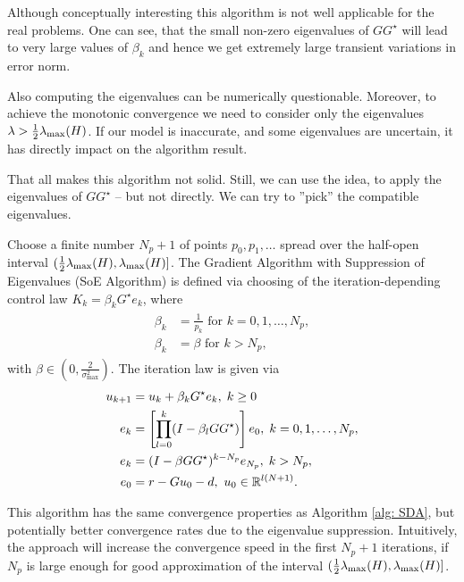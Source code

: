 Although conceptually interesting this algorithm is not well applicable for the real problems. One can see, that the small non-zero eigenvalues of $GG^\star$ will lead to very large values of $\beta_k$ and hence we get extremely large transient variations in error norm. 

Also computing the eigenvalues can be numerically questionable. Moreover, to achieve the monotonic convergence we need to consider only the eigenvalues $\lambda > \frac{1}{2}\lambda_{\mathrm{max}}(H)$.
If our model is inaccurate, and some eigenvalues are uncertain, it has directly impact on the algorithm result. 

That all makes this algorithm not solid. Still, we can use the idea, to apply the eigenvalues of $G G^{\star}$ -- but not directly. We can try to ''pick'' the compatible eigenvalues.
\begin{alg}
	Choose a finite number $N_p + 1$ of points $p_0, p_1, \dots$ spread over the half-open interval $(\frac{1}{2}\lambda_{\mathrm{max}}(H), \lambda_{\mathrm{max}}(H)]$. 
	The Gradient Algorithm with Suppression of Eigenvalues (SoE Algorithm) is defined via choosing of the iteration-depending control law  $K_k = \beta_k G^\star e_k$, where 
	\begin{align}
	\begin{split}
	\beta_k &= \frac{1}{p_k} \text{ for } k = 0 , 1, \dots , N_p,\\
	\beta_k &= \beta  \text{ for } k > N_p,
	\end{split}
	\end{align}
	with $\beta \in (0, \frac{2}{\sigma_{\max}^2})$.
	The iteration law is given via
	\begin{align}
	\begin{split}
	u_{k+1} &= u_k + \beta_k G^\star e_k, \; k\geq 0\\
	e _{k} &= \left[\prod_{l = 0}^k (I - \beta_l  GG^\star) \right] e_{0}, \;  k = 0 , 1, \dots , N_p,\\
	e _{k} &=  (I - \beta GG^\star)^{k - N_p} e_{N_p}, \;  k > N_p, \\
	e_0 &= r -  Gu_0 -d, \text{ } u_0 \in {\mathbb{R}}^{l (N+1)}.
	\end{split}
	\end{align}	
\end{alg}

This algorithm has the same convergence properties as Algorithm \ref{alg: SDA}, but potentially better convergence rates due to the eigenvalue suppression. Intuitively, the approach will increase the convergence speed in the first $N_p + 1$ iterations, if $N_p$ is large enough for good approximation of the interval $(\frac{1}{2} \lambda_{\mathrm{max}}(H), \lambda_{\mathrm{max}}(H)]$.

